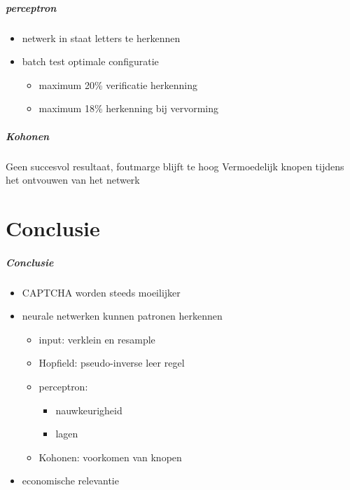\documentclass{beamer}
\begin{document}
\begin{frame}
  \frametitle{perceptron}
    \begin{itemize}
      \item netwerk in staat letters te herkennen
      \item batch test optimale configuratie
        \begin{itemize}
          \item maximum 20\% verificatie herkenning
          \item maximum 18\% herkenning bij vervorming
        \end{itemize}
    \end{itemize}
    \vfill
\end{frame}
\begin{frame}
  \frametitle{Kohonen}
  Geen succesvol resultaat, foutmarge blijft te hoog
  \vfill
  Vermoedelijk knopen tijdens het ontvouwen van het netwerk
\end{frame}
\part{Conclusie}
\begin{frame}
  \frametitle{Conclusie}
  \begin{itemize}
    \item<+-> CAPTCHA worden steeds moeilijker
    \item<+-> neurale netwerken kunnen patronen herkennen
      \begin{itemize}
        \item<+-> input: verklein en resample
        \item<+-> Hopfield: pseudo-inverse leer regel
        \item<+-> perceptron:
          \begin{itemize}
            \item nauwkeurigheid
            \item lagen
          \end{itemize}
        \item<+-> Kohonen: voorkomen van knopen 
      \end{itemize}
    \item<+-> economische relevantie
  \end{itemize}
\end{frame}
\end{document}
